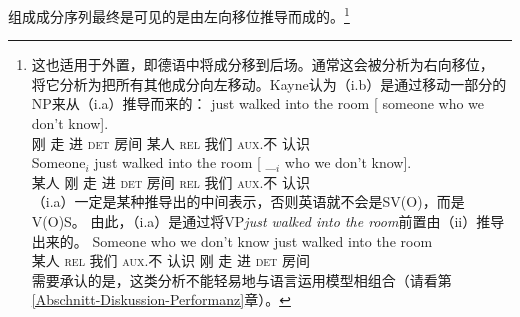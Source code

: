组成成分序列最终是可见的是由左向移位推导而成的。\footnote{\label{fn-Kayne-Extraposition}%
这也适用于外置，即德语中将成分移到后场。通常这会被分析为右向移位， \citet[\S~9]{Kayne94a-u}将它分析为把所有其他成分向左移动。Kayne认为（i.b）是通过移动一部分的NP来从（i.a）推导而来的：
\eal
\ex 
\gll just walked into the           room [ someone who we don't know].\\
     刚   走      进   \textsc{det}  房间 {}         某人     \textsc{rel}  我们 \textsc{aux}.不 认识\\
\ex 
\gll Someone$_i$ just walked into the         room [ \_$_i$ who we don't know].\\
     某人         刚   走     进   \textsc{det} 房间 {}        {}     \textsc{rel} 我们 \textsc{aux}.不 认识\\
\zl
（i.a）一定是某种推导出的中间表示，否则英语就不会是SV(O)，而是V(O)S。
由此，（i.a）是通过将VP\emph{just walked into the room}前置由（ii）推导出来的。
\ea
\gll Someone who we don't know just walked into the room\\
某人 \textsc{rel} 我们 \textsc{aux}.不 认识 刚 走 进 \textsc{det} 房间\\
\z
需要承认的是，这类分析不能轻易地与语言运用模型相组合（请看第\ref{Abschnitt-Diskussion-Performanz}章）。
}
